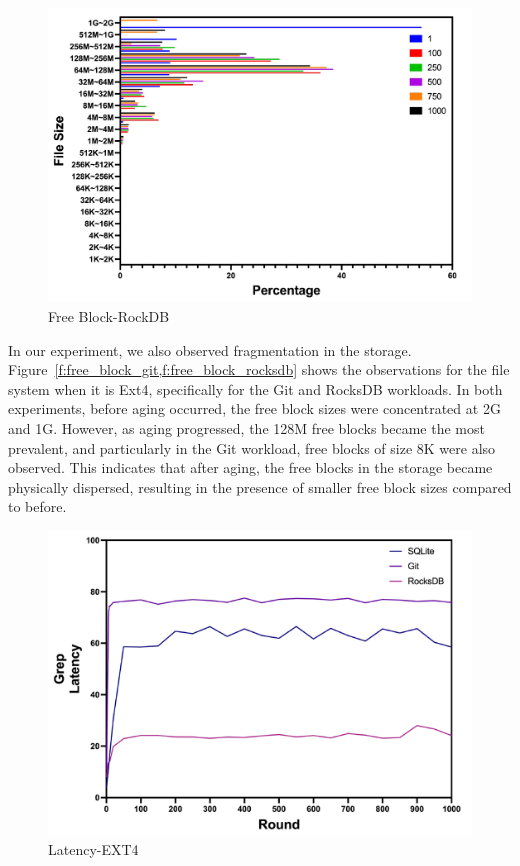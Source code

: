 \begin{figure}[t]
    \centering
	\includegraphics[width=0.95\columnwidth]{graphs/free_block_rocksdb}
	\caption{Free Block-RockDB}
	\label{f:free_block_rocksdb}
\end{figure}
In our experiment, we also observed fragmentation in the storage.
Figure~\ref{f:free_block_git,f:free_block_rocksdb} shows the observations for the file system when it is Ext4, specifically for the Git and RocksDB workloads.
In both experiments, before aging occurred, the free block sizes were concentrated at 2G and 1G.
However, as aging progressed, the 128M free blocks became the most prevalent, and particularly in the Git workload, free blocks of size 8K were also observed.
This indicates that after aging, the free blocks in the storage became physically dispersed, resulting in the presence of smaller free block sizes compared to before.

\begin{figure}[t]
    \centering
	\includegraphics[width=0.95\columnwidth]{graphs/ext_latency}
	\caption{Latency-EXT4}
	\label{f:ext_latency}
\end{figure}

